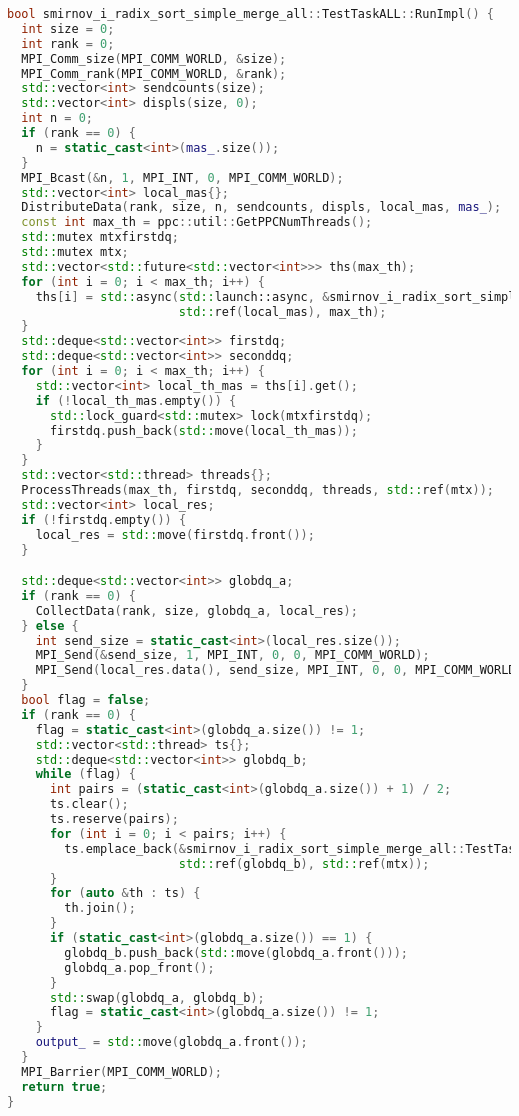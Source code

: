 \documentclass[a4paper,12pt]{article}
\begin{document}
\begin{lstlisting}[language=C++,caption={Фрагмент MPI+STL версии}]
bool smirnov_i_radix_sort_simple_merge_all::TestTaskALL::RunImpl() {
  int size = 0;
  int rank = 0;
  MPI_Comm_size(MPI_COMM_WORLD, &size);
  MPI_Comm_rank(MPI_COMM_WORLD, &rank);
  std::vector<int> sendcounts(size);
  std::vector<int> displs(size, 0);
  int n = 0;
  if (rank == 0) {
    n = static_cast<int>(mas_.size());
  }
  MPI_Bcast(&n, 1, MPI_INT, 0, MPI_COMM_WORLD);
  std::vector<int> local_mas{};
  DistributeData(rank, size, n, sendcounts, displs, local_mas, mas_);
  const int max_th = ppc::util::GetPPCNumThreads();
  std::mutex mtxfirstdq;
  std::mutex mtx;
  std::vector<std::future<std::vector<int>>> ths(max_th);
  for (int i = 0; i < max_th; i++) {
    ths[i] = std::async(std::launch::async, &smirnov_i_radix_sort_simple_merge_all::TestTaskALL::Sorting, i,
                        std::ref(local_mas), max_th);
  }
  std::deque<std::vector<int>> firstdq;
  std::deque<std::vector<int>> seconddq;
  for (int i = 0; i < max_th; i++) {
    std::vector<int> local_th_mas = ths[i].get();
    if (!local_th_mas.empty()) {
      std::lock_guard<std::mutex> lock(mtxfirstdq);
      firstdq.push_back(std::move(local_th_mas));
    }
  }
  std::vector<std::thread> threads{};
  ProcessThreads(max_th, firstdq, seconddq, threads, std::ref(mtx));
  std::vector<int> local_res;
  if (!firstdq.empty()) {
    local_res = std::move(firstdq.front());
  }

  std::deque<std::vector<int>> globdq_a;
  if (rank == 0) {
    CollectData(rank, size, globdq_a, local_res);
  } else {
    int send_size = static_cast<int>(local_res.size());
    MPI_Send(&send_size, 1, MPI_INT, 0, 0, MPI_COMM_WORLD);
    MPI_Send(local_res.data(), send_size, MPI_INT, 0, 0, MPI_COMM_WORLD);
  }
  bool flag = false;
  if (rank == 0) {
    flag = static_cast<int>(globdq_a.size()) != 1;
    std::vector<std::thread> ts{};
    std::deque<std::vector<int>> globdq_b;
    while (flag) {
      int pairs = (static_cast<int>(globdq_a.size()) + 1) / 2;
      ts.clear();
      ts.reserve(pairs);
      for (int i = 0; i < pairs; i++) {
        ts.emplace_back(&smirnov_i_radix_sort_simple_merge_all::TestTaskALL::Merging, std::ref(globdq_a),
                        std::ref(globdq_b), std::ref(mtx));
      }
      for (auto &th : ts) {
        th.join();
      }
      if (static_cast<int>(globdq_a.size()) == 1) {
        globdq_b.push_back(std::move(globdq_a.front()));
        globdq_a.pop_front();
      }
      std::swap(globdq_a, globdq_b);
      flag = static_cast<int>(globdq_a.size()) != 1;
    }
    output_ = std::move(globdq_a.front());
  }
  MPI_Barrier(MPI_COMM_WORLD);
  return true;
}
\end{lstlisting}
\end{document}
